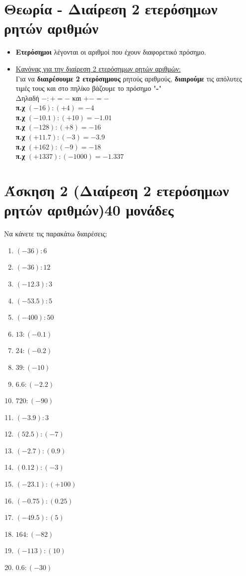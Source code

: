 \documentclass[a4paper,10pt]{report}
\begin{document}
\newpage
\section*{Θεωρία - Διαίρεση 2 ετερόσημων ρητών αριθμών\hfill \small{}}
\begin{itemize}
 \item \textbf{Ετερόσημοι} λέγονται οι αριθμοί που έχουν διαφορετικό πρόσημο. 
 \item \underline{ Κανόνας για την διαίρεση 2 ετερόσημων ρητών αριθμών:} \\
       Για να \textbf{διαιρέσουμε 2 ετερόσημους} ρητούς αριθμούς, 
       \textbf{διαιρούμε} τις απόλυτες τιμές τους και στο πηλίκο βάζουμε το πρόσημο "\textbf{-}"\\
       Δηλαδή $-:+=-$ και $+ -=-$\\
       \textbf{π.χ} $(-16):(+4)=-4$\\
       \textbf{π.χ} $(-10.1):(+10)=-1.01$\\
       \textbf{π.χ} $(-128):(+8)=-16$ \\
       \textbf{π.χ} $(+11.7):(-3)=-3.9$ \\
       \textbf{π.χ} $(+162):(-9)=-18$ \\
       \textbf{π.χ} $(+1337):(-1000)=-1.337$ \\
\end{itemize}

\section*{Άσκηση 2  (Διαίρεση 2 ετερόσημων ρητών αριθμών)\hfill \small{40 μονάδες}}
Να κάνετε τις παρακάτω διαιρέσεις:
\begin{multicols}{2}
\begin{enumerate}[1)]
 \item $(-36):6$
 \item $(-36):12$
 \item $(-12.3):3$
 \item $(-53.5):5$
 \item $(-400):50$
 \item $13:(-0.1)$
 \item $24:(-0.2)$
 \item $39:(-10)$
 \item $6.6:(-2.2)$
 \item $720:(-90)$
 \item $(-3.9):3$
 \item $(52.5):(-7)$
 \item $(-2.7):(0.9)$
 \item $(0.12):(-3)$
 \item $(-23.1):(+100)$
 \item $(-0.75):(0.25)$
 \item $(-49.5):(5)$
 \item $164:(-82)$
 \item $(-113):(10)$
 \item $0.6:(-30)$
\end{enumerate}
\end{multicols}
\end{document}
